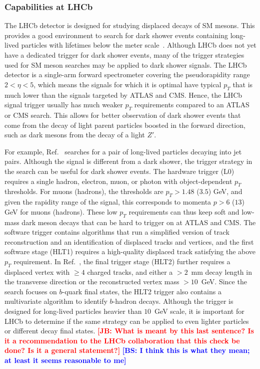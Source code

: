 \subsubsection{Capabilities at LHCb}

The LHCb detector is designed for studying displaced decays of SM mesons. This provides a good environment to search for dark shower events containing long-lived particles with lifetimes below the meter scale~\cite{Strassler:2006qa}. Although LHCb does not yet have a dedicated trigger for dark shower events, many of the trigger strategies used for SM meson searches may be applied to dark shower signals. The LHCb detector is a single-arm forward spectrometer covering the pseudorapidity range $2<\eta<5$, which means the signals for which it is optimal have typical $p_T$ that is much lower than the signals targeted by ATLAS and CMS. Hence, the LHCb signal trigger usually has much weaker $p_T$ requirements compared to an ATLAS or CMS search. This allows for better observation of dark shower events that come from the decay of light parent particles boosted in the forward direction, such as dark mesons from the decay of a light $Z'$.

For example, Ref.~\cite{Aaij:2014nma} searches for a pair of long-lived particles decaying into jet pairs. Although the signal is different from a dark shower, the trigger strategy in the search can be useful for dark shower events. The hardware trigger (L0) requires a single hadron, electron, muon, or photon with object-dependent $p_T$ thresholds. For muons (hadrons), the thresholds are $p_T>1.48$ ($3.5$) GeV, and given the rapidity range of the signal, this corresponds to momenta $p> 6$ ($13$) GeV for muons (hadrons). These low $p_T$ requirements can thus keep soft and low-mass dark meson decays that can be hard to trigger on at ATLAS and CMS. The software trigger contains algorithms that run a simplified version of track reconstruction and an identification of displaced tracks and vertices, and the first software stage (HLT1) requires a high-quality displaced track satisfying the above $p_T$ requirement. In Ref.~\cite{Aaij:2014nma}, the final trigger stage (HLT2) further requires a displaced vertex with $\geq 4$ charged tracks, and either a $>2$~mm decay length in the transverse direction or the reconstructed vertex mass $>10$~GeV. Since the search focuses on $b$-quark final states, the HLT2 trigger also contains a multivariate algorithm to identify $b$-hadron decays. Although the trigger is designed for long-lived particles heavier than $10$~GeV scale, it is important for LHCb to determine if the same strategy can be applied to even lighter particles or different decay final states. {\bf \textcolor{red}{[JB: What is meant by this last sentence?  Is it a recommendation to the LHCb collaboration that this check be done?  Is it a general statement?]}} {\bf \textcolor{blue}{[BS: I think this is what they mean; at least it seems reasonable to me]}}


